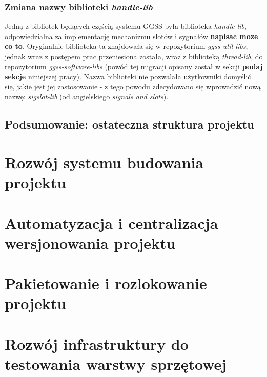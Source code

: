 \subsubsection{Zmiana nazwy biblioteki \emph{handle-lib}}
Jedną z bibliotek będących częścią systemu GGSS była biblioteka \emph{handle-lib}, odpowiedzialna za implementację mechanizmu slotów i sygnałów \textbf{napisac moze co to}. Oryginalnie biblioteka ta znajdowała się w repozytorium \emph{ggss-util-libs}, jednak wraz z postępem prac przeniesiona została, wraz z biblioteką \emph{thread-lib}, do repozytorium \emph{ggss-software-libs} (powód tej migracji opisany został w sekcji \textbf{podaj sekcje} niniejszej pracy). Nazwa biblioteki nie pozwalała użytkowniki domyślić się, jakie jest jej zastosowanie - z tego powodu zdecydowano się wprowadzić nową nazwę: \emph{sigslot-lib} (od angielskiego \emph{signals and slots}).


\subsection{Podsumowanie: ostateczna struktura projektu}







\section{Rozwój systemu budowania projektu}
\section{Automatyzacja i centralizacja wersjonowania projektu}
\section{Pakietowanie i rozlokowanie projektu}
\section{Rozwój infrastruktury do testowania warstwy sprzętowej}

